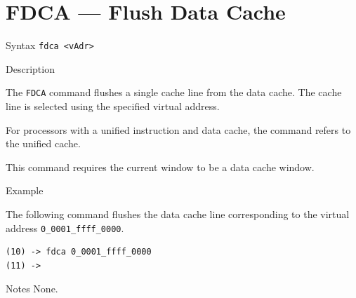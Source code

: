 %
%
\pagebreak
\section*{FDCA — Flush Data Cache}

\begin{iPageDescEntry}{Syntax}
\texttt{fdca <vAdr>} \\
\end{iPageDescEntry}

\begin{iPageDescEntry}{Description}

The \texttt{FDCA} command flushes a single cache line from the data cache.
The cache line is selected using the specified virtual address.

For processors with a unified instruction and data cache, the command refers to the unified cache.

This command requires the current window to be a data cache window.

\end{iPageDescEntry}

\begin{iPageDescEntry}{Example}

The following command flushes the data cache line corresponding to the virtual
address \texttt{0\_0001\_ffff\_0000}.

\begin{lstlisting}[style=iPageOpStyle]
(10) -> fdca 0_0001_ffff_0000
(11) ->
\end{lstlisting}

\end{iPageDescEntry}

\begin{iPageDescEntry}{Notes}
None.
\end{iPageDescEntry}
